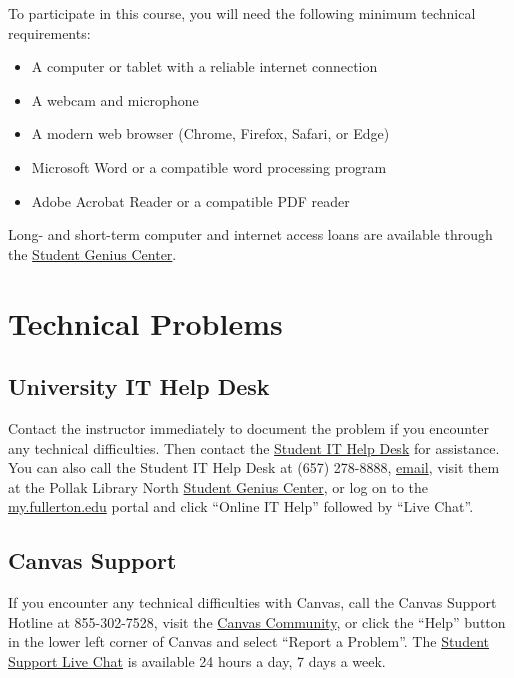 \documentclass[12pt, letterpaper]{article}
\begin{document}
To participate in this course, you will need the following minimum technical requirements:
\begin{itemize}
    \item A computer or tablet with a reliable internet connection
    \item A webcam and microphone
    \item A modern web browser (Chrome, Firefox, Safari, or Edge)
    \item Microsoft Word or a compatible word processing program
    \item Adobe Acrobat Reader or a compatible PDF reader
\end{itemize}


\noindent Long- and short-term computer and internet access loans are available through the \href{http://www.fullerton.edu/it/students/sgc/index.php}{Student Genius Center}.

\section{Technical Problems}

\subsection*{University IT Help Desk}

Contact the instructor immediately to document the problem if you encounter any technical difficulties. Then contact the \href{http://www.fullerton.edu/it/students/helpdesk/index.php}{Student IT Help Desk} for assistance. You can also call the Student IT Help Desk at (657) 278-8888, \href{mailto:StudentITHelpDesk@fullerton.edu}{email}, visit them at the Pollak Library North \href{http://www.fullerton.edu/it/students/sgc/index.php}{Student Genius Center}, or log on to the \href{http://my.fullerton.edu/}{my.fullerton.edu} portal and click ``Online IT Help'' followed by ``Live Chat''.

\subsection*{Canvas Support}

If you encounter any technical difficulties with Canvas, call the Canvas Support Hotline at 855-302-7528, visit the \href{https://community.canvaslms.com/docs/DOC-10720-67952720329}{Canvas Community}, or click the ``Help'' button in the lower left corner of Canvas and select ``Report a Problem''. The \href{https://cases.canvaslms.com/liveagentchat?chattype=student&sfid=001A000000YzcwQIAR}{Student Support Live Chat} is available 24 hours a day, 7 days a week.
\end{document}
